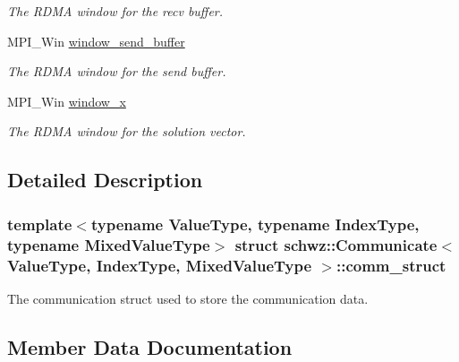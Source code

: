 \begin{DoxyCompactItemize}
\begin{DoxyCompactList}\small\item\em The R\+D\+MA window for the recv buffer. \end{DoxyCompactList}\item 
\mbox{\label{structschwz_1_1Communicate_1_1comm__struct_af2c5d4bfea8073b2c885eec175b92416}} 
M\+P\+I\+\_\+\+Win \hyperlink{structschwz_1_1Communicate_1_1comm__struct_af2c5d4bfea8073b2c885eec175b92416}{window\+\_\+send\+\_\+buffer}
\begin{DoxyCompactList}\small\item\em The R\+D\+MA window for the send buffer. \end{DoxyCompactList}\item 
\mbox{\label{structschwz_1_1Communicate_1_1comm__struct_a5da0c24baf9d9955d764fe4b3274a982}} 
M\+P\+I\+\_\+\+Win \hyperlink{structschwz_1_1Communicate_1_1comm__struct_a5da0c24baf9d9955d764fe4b3274a982}{window\+\_\+x}
\begin{DoxyCompactList}\small\item\em The R\+D\+MA window for the solution vector. \end{DoxyCompactList}\end{DoxyCompactItemize}


\subsection{Detailed Description}
\subsubsection*{template$<$typename Value\+Type, typename Index\+Type, typename Mixed\+Value\+Type$>$\newline
struct schwz\+::\+Communicate$<$ Value\+Type, Index\+Type, Mixed\+Value\+Type $>$\+::comm\+\_\+struct}

The communication struct used to store the communication data. 

\subsection{Member Data Documentation}
\mbox{\label{structschwz_1_1Communicate_1_1comm__struct_a4166e2bb75eeaf48ee39ca7cdc3adb01}} 
